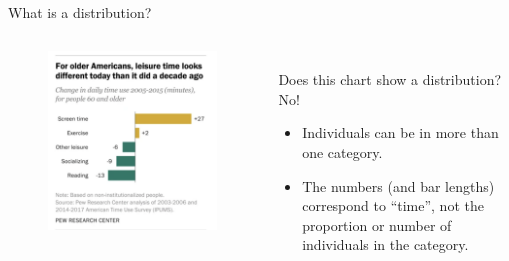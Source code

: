 \documentclass[aspectratio=169]{../latex_main/tntbeamer}  %
\begin{document}
	
	\begin{frame}{What is a distribution?}
	    \vspace{-1em}
	    \begin{columns}
	        \begin{column}{.4\textwidth}
	        
	              \begin{figure}
	                  \includegraphics[scale=.49]{Bild18}
	               \end{figure} 
	               
	        \end{column}
	        
	        \begin{column}{.6\textwidth}
	           
	              \\Does this chart show a distribution?\\
	              \bigskip
	              No!
	              \begin{itemize}
	                  \item Individuals can be in more than one category.
	                  \item The numbers (and bar lengths) correspond to ``time'', not the proportion or number of individuals in the category.
	              \end{itemize}
	              
	        \end{column}
	        
	    \end{columns}
	\end{frame}
	
\end{document}
